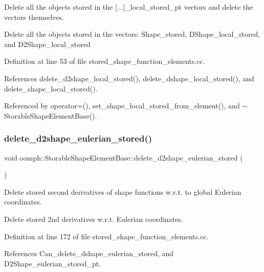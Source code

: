 Delete all the objects stored in the \mbox{[}...\mbox{]}\+\_\+local\+\_\+stored\+\_\+pt vectors and delete the vectors themselves. 

Delete all the objects stored in the vectors\+: Shape\+\_\+stored, D\+Shape\+\_\+local\+\_\+stored, and D2\+Shape\+\_\+local\+\_\+stored 

Definition at line 53 of file stored\+\_\+shape\+\_\+function\+\_\+elements.\+cc.



References delete\+\_\+d2shape\+\_\+local\+\_\+stored(), delete\+\_\+dshape\+\_\+local\+\_\+stored(), and delete\+\_\+shape\+\_\+local\+\_\+stored().



Referenced by operator=(), set\+\_\+shape\+\_\+local\+\_\+stored\+\_\+from\+\_\+element(), and $\sim$\+Storable\+Shape\+Element\+Base().

\mbox{\label{classoomph_1_1StorableShapeElementBase_a8c90dd66f8d564ecb809ed041916c96a}} 
\subsubsection{\texorpdfstring{delete\+\_\+d2shape\+\_\+eulerian\+\_\+stored()}{delete\_d2shape\_eulerian\_stored()}}
{\footnotesize\ttfamily void oomph\+::\+Storable\+Shape\+Element\+Base\+::delete\+\_\+d2shape\+\_\+eulerian\+\_\+stored (\begin{DoxyParamCaption}{ }\end{DoxyParamCaption})}



Delete stored second derivatives of shape functions w.\+r.\+t. to global Eulerian coordinates. 

Delete stored 2nd derivatives w.\+r.\+t. Eulerian coordinates. 

Definition at line 172 of file stored\+\_\+shape\+\_\+function\+\_\+elements.\+cc.



References Can\+\_\+delete\+\_\+dshape\+\_\+eulerian\+\_\+stored, and D2\+Shape\+\_\+eulerian\+\_\+stored\+\_\+pt.




